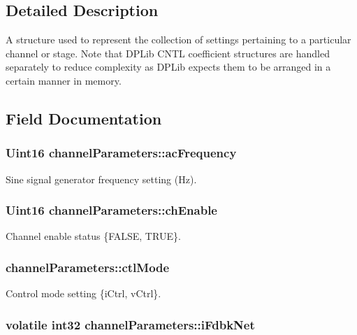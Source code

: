 \subsection{Detailed Description}
A structure used to represent the collection of settings pertaining to a particular channel or stage. Note that D\-P\-Lib C\-N\-T\-L coefficient structures are handled separately to reduce complexity as D\-P\-Lib expects them to be arranged in a certain manner in memory. 

\subsection{Field Documentation}
\hypertarget{a00003_a817bac18060f842dca3867eeb7e2d06c}{
\subsubsection[{ac\-Frequency}]{\setlength{\rightskip}{0pt plus 5cm}Uint16 channel\-Parameters\-::ac\-Frequency}}\label{a00003_a817bac18060f842dca3867eeb7e2d06c}
Sine signal generator frequency setting (Hz). \hypertarget{a00003_af99576e00746544eab1d4e88d12f39b4}{
\subsubsection[{ch\-Enable}]{\setlength{\rightskip}{0pt plus 5cm}Uint16 channel\-Parameters\-::ch\-Enable}}\label{a00003_af99576e00746544eab1d4e88d12f39b4}
Channel enable status \{F\-A\-L\-S\-E, T\-R\-U\-E\}. \hypertarget{a00003_ab31dab8e873272dd15641943b20e56a5}{
\subsubsection[{ctl\-Mode}]{ channel\-Parameters\-::ctl\-Mode}}\label{a00003_ab31dab8e873272dd15641943b20e56a5}
Control mode setting \{i\-Ctrl, v\-Ctrl\}. \hypertarget{a00003_ad4f53b220d97af172b01f1a6d57a9635}{
\subsubsection[{i\-Fdbk\-Net}]{\setlength{\rightskip}{0pt plus 5cm}volatile int32 channel\-Parameters\-::i\-Fdbk\-Net}}\label{a00003_ad4f53b220d97af172b01f1a6d57a9635}
